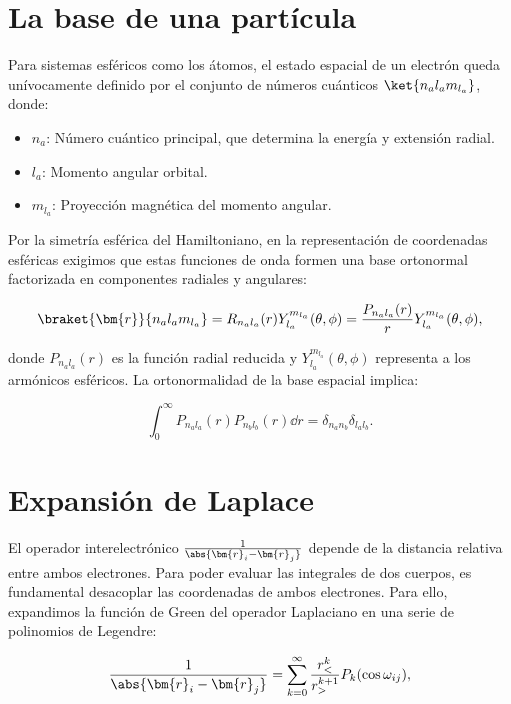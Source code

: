\section{La base de una partícula}

Para sistemas esféricos como los átomos, el estado espacial de un electrón queda unívocamente definido por el conjunto de números cuánticos \( \ket{n_a l_a m_{l_a}} \), donde:

\begin{itemize}
\item \( n_a \): Número cuántico principal, que determina la energía y extensión radial.
\item \( l_a \): Momento angular orbital.
\item \( m_{l_a} \): Proyección magnética del momento angular.
\end{itemize}

Por la simetría esférica del Hamiltoniano, en la representación de coordenadas esféricas exigimos que estas funciones de onda formen una base ortonormal factorizada en componentes radiales y angulares:

\begin{equation}
\braket{\bm{r}}{n_a l_a m_{l_a}} = R_{n_a l_a}(r) Y_{l_a}^{m_{l_a}}(\theta, \phi) = \frac{P_{n_a l_a}(r)}{r} Y_{l_a}^{m_{l_a}}(\theta, \phi),
\end{equation}

donde \( P_{n_a l_a}(r) \) es la función radial reducida y \( Y_{l_a}^{m_{l_a}}(\theta, \phi) \) representa a los armónicos esféricos. La ortonormalidad de la base espacial implica:

\begin{equation}
\int_0^\infty P_{n_a l_a}(r) P_{n_b l_b}(r) \dd{r} = \delta_{n_a n_b} \delta_{l_a l_b}.
\end{equation}

\section{Expansión de Laplace}

El operador interelectrónico \( \frac{1}{\abs{\bm{r}_i-\bm{r}_j}} \) depende de la distancia relativa entre ambos electrones. Para poder evaluar las integrales de dos cuerpos, es fundamental desacoplar las coordenadas de ambos electrones. Para ello, expandimos la función de Green del operador Laplaciano en una serie de polinomios de Legendre:

\begin{equation}
  \label{eq:laplace}
  \frac{1}{\abs{\bm{r}_i-\bm{r}_j}} = \sum_{k=0}^{\infty} \frac{r_{<}^k}{r_{>}^{k+1}} P_k(\cos\omega_{ij}),
\end{equation}

